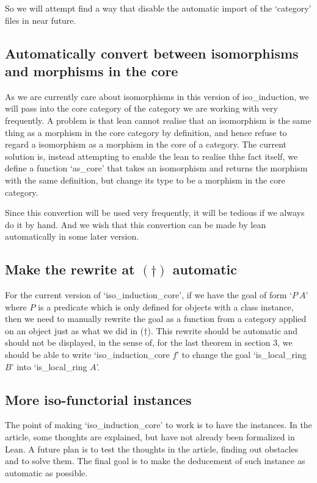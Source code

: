 \documentclass[11pt]{article}
\begin{document}
So we will attempt find a way that disable the automatic import of the `category' files in near future.

\subsection{Automatically convert between isomorphisms and morphisms in the core}

As we are currently care about isomorphisms in this version of iso\_induction, we will pass into the core category of the category we are working with very frequently. A problem is that lean cannot realise that an isomorphism is the same thing as a morphism in the core category by definition, and hence refuse to regard a isomorphism as a morphism in the core of a category. The current solution is, instead attempting to enable the lean to realise thhe fact itself, we define a function `as\_core' that takes an isomorphism and returns the morphism with the same definition, but change its type to be a morphism in the core category.

Since this convertion will be used very frequently, it will be tedious if we always do it by hand. And we wish that this convertion can be made by lean automatically in some later version.

\subsection{Make the rewrite at $(\dagger)$ automatic}

For the current version of `iso\_induction\_core', if we have the goal of form `$P \ A$' where $P$ is a predicate which is only defined for objects with a class instance, then we need to manually rewrite the goal as a function from a category applied on an object just as what we did in ($\dagger$). This rewrite should be automatic and should not be displayed, in the sense of, for the last theorem in section 3, we should be able to write `iso\_induction\_core $f$' to change the goal `is\_local\_ring $B$' into `is\_local\_ring $A$'.


\subsection{More iso-functorial instances}

The point of making `iso\_induction\_core' to work is to have the instances. In the article, some thoughts are explained, but have not already been formalized in Lean. A future plan is to test the thoughts in the article, finding out obstacles and to solve them. The final goal is to make the deducement of such instance as automatic as possible.
\end{document}
